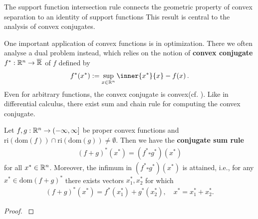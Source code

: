 \begin{takeaways}
  The support function intersection rule connects the geometric 
  property of convex separation to an identity of support functions
  This result is central to the analysis of convex conjugates.
\end{takeaways}
One important application of convex functions is in optimization.
There we often analyse a dual problem instead, which relies on the notion of \textbf{convex conjugate} 
$
    f^*:
    \mathbb{R}^n \to \overline{\mathbb{R}}
  $
  of $f$ defined by
  \begin{gather}
    \label{def:convex_conjugate}
    f^*(x^*)
    :=
    \sup_{ x \in \R^n }
    \inner
    {x^*}{x}
    - f(x)
    \,.
  \end{gather}
  Even for arbitrary functions, the convex conjugate is convex(cf.
  \cite[Proposition~4.2]{Mordukhovich2022}
  ).
  Like in differential calculus, there exist sum and chain rule for computing the convex conjugate.
\begin{theorem}
  Let
  $
    f,g:
    \mathbb{R}^n \to (-\infty, \infty]
  $
  be proper convex functions 
  and
  $
  \text{ri}\left( \text{dom}(f) \right)
  \cap
  \text{ri}\left( \text{dom}(g) \right)
  \neq 
  \emptyset
  .
  $
  Then we have the 
  \textbf{
  conjugate sum rule
  }
  \begin{gather}
    ( f + g )^*(x^*)
    =
    ( f^* \square g^*)(x^*)
  \end{gather}
  for all $x^* \in \mathbb{R}^n$.
  Moreover, the infimum in 
  $
    ( f^* \square g^*)(x^*)
  $
  is attained, i.e., for any
  $
    x^* \in \text{dom}(f+g)^*
  $
  there exists vectors $x_1^*, x_2^*$
  for which
  \begin{gather}
    (f+g)^*(x^*)
    =
    f^*(x_1^*)
    +
    g^*(x_2^*),
    \quad
    x^* = x_1^* + x_2^*.
  \end{gather}
\end{theorem}
\begin{proof}
  \cite[Theorem~4.27(c)]{Mordukhovich2022}
\end{proof}



